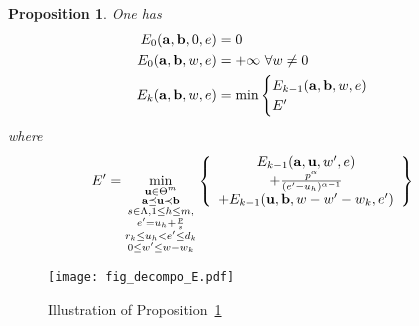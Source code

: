 \documentclass[11pt,a4paper]{article}
\newtheorem{prop}{Proposition}
\newcommand{\vecteur}[1]{\ensuremath{\mathbf{#1}}}
\begin{document}
\begin{prop}\label{prop_E}
One has
\begin{align*}
E_0(\vecteur{a},\vecteur{b},0,e) &=0 \notag \\
E_0(\vecteur{a},\vecteur{b},w,e) &=+ \infty~\forall w \neq 0	\notag \\
E_k(\vecteur{a},\vecteur{b},w,e) 
  	&= \min \begin{cases} 
		E_{k-1}(\vecteur{a},\vecteur{b},w,e) 	\\
E'
	\end{cases}
\end{align*}
where
\begin{align*}
E'=\min_{
			\substack{
			\vecteur{u}\in \Theta^m\\
			\vecteur{a}\preceq \vecteur{u} \prec \vecteur{b}\\
			s \in \Lambda, 1 \leq h \leq m,\\
			e' = u_{h} + \frac{p}{s}\\
			r_{k} \le u_{h} < e' \le d_k\\
			0\le w' \le w-w_k}}
		&\left\{
		\begin{array}{c}
			E_{k-1}(\vecteur{a},\vecteur{u},w',e) \\
			+ \frac{p^\alpha}{(e'-u_{h})^{\alpha-1}}\\
 			+E_{k-1}(\vecteur{u},\vecteur{b},w-w'-w_k,e')
 		\end{array} \notag
		\right\}
\end{align*}
\end{prop}

\begin{figure}[ht]
\begin{center}
\texttt{[image: fig\_decompo\_E.pdf]}
\end{center}
\caption{Illustration of Proposition~\ref{prop_E}}
\label{fig_E}
\end{figure}
\end{document}

